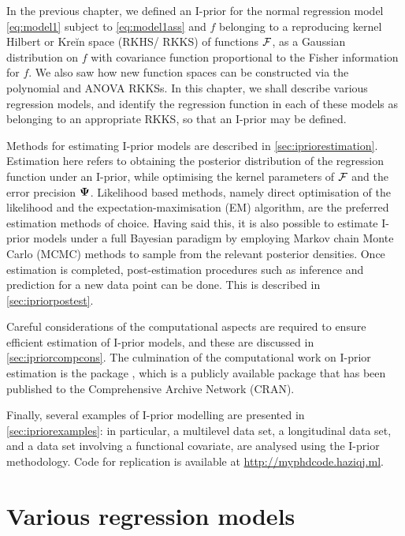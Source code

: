 \documentclass[showframe,11pt,twoside,openright]{report}
\begin{document}
\label{chapter4}
\thispagestyle{chapterfour}

In the previous chapter, we defined an I-prior for the normal regression model \cref{eq:model1} subject to \cref{eq:model1ass} and $f$ belonging to a reproducing kernel Hilbert or Kreĭn space (RKHS/ RKKS) of functions ${\mathcal F}$, as a Gaussian distribution on $f$ with covariance function proportional to the Fisher information for $f$.
We also saw how new function spaces can be constructed via the polynomial and ANOVA RKKSs.
In this chapter, we shall describe various regression models, and identify the regression function in each of these models as belonging to an appropriate RKKS, so that an I-prior may be defined.

Methods for estimating I-prior models are described in \cref{sec:ipriorestimation}.
Estimation here refers to obtaining the posterior distribution of the regression function under an I-prior, while optimising the kernel parameters of ${\mathcal F}$ and the error precision ${\bm\Psi}$.
Likelihood based methods, namely direct optimisation of the likelihood and the expectation-maximisation (EM) algorithm, are the preferred estimation methods of choice.
Having said this, it is also possible to estimate I-prior models under a full Bayesian paradigm by employing Markov chain Monte Carlo (MCMC) methods to sample from the relevant posterior densities.
Once estimation is completed, post-estimation procedures such as inference and prediction for a new data point can be done.
This is described in \cref{sec:ipriorpostest}.

Careful considerations of the computational aspects are required to ensure efficient estimation of I-prior models, and these are discussed in \cref{sec:ipriorcompcons}.
The culmination of the computational work on I-prior estimation is the  package \citep{jamil2017iprior}, which is a publicly available  package that has been published to the Comprehensive  Archive Network (CRAN).

Finally, several examples of I-prior modelling are presented in  \cref{sec:ipriorexamples}: in particular, a multilevel data set, a longitudinal data set, and a data set involving a functional covariate, are analysed using the I-prior methodology.
Code for replication is available at \url{http://myphdcode.haziqj.ml}.

\section{Various regression models}
\label{sec:various-regression}

\end{document}
